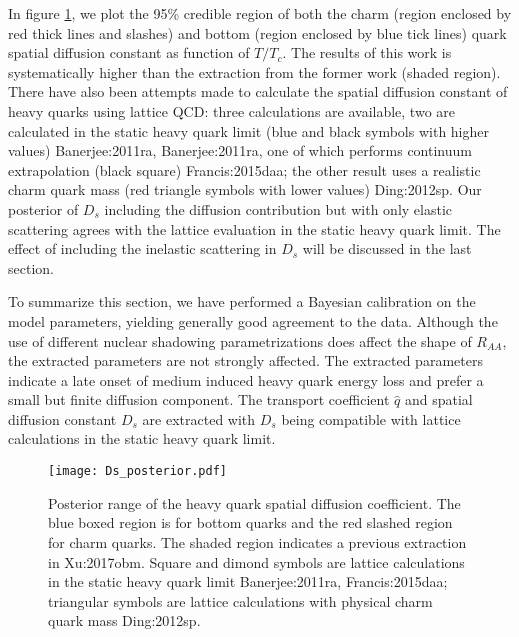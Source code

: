 In figure \ref{plots:posterior_Ds}, we plot the 95\% credible region of both the charm (region enclosed by red thick lines and slashes) and bottom (region enclosed by blue tick lines) quark spatial diffusion constant as function of $T/T_c$.
The results of this work is systematically higher than the extraction from the former work (shaded region).
There have also been attempts made to calculate the spatial diffusion constant of heavy quarks using lattice QCD: three calculations are available, two are calculated in the static heavy quark limit (blue and black symbols with higher values) {Banerjee:2011ra, Banerjee:2011ra}, one of which performs continuum extrapolation (black square) {Francis:2015daa}; the other result uses a realistic charm quark mass (red triangle symbols with lower values) {Ding:2012sp}.
Our posterior of $D_s$ including the diffusion contribution but with only elastic scattering agrees with the lattice evaluation in the static heavy quark limit.
The effect of including the inelastic scattering in $D_s$ will be discussed in the last section.

To summarize this section, we have performed a Bayesian calibration on the model parameters, yielding
generally good agreement to the data.
Although the use of different nuclear shadowing parametrizations does affect the shape of $R_{AA}$, the extracted parameters are not strongly affected.
The extracted parameters indicate a late onset of medium induced heavy quark energy loss and prefer a small but finite diffusion component.
The transport coefficient $\hat{q}$ and spatial diffusion constant $D_s$ are extracted with $D_s$ being compatible with lattice calculations in the static heavy quark limit. 

\begin{figure}
\texttt{[image: Ds\_posterior.pdf]}
\caption{Posterior range of the heavy quark spatial diffusion coefficient. The blue boxed region is for bottom quarks and the red slashed region for charm quarks. The shaded region indicates a previous extraction in {Xu:2017obm}. Square and dimond symbols are lattice calculations in the static heavy quark limit {Banerjee:2011ra, Francis:2015daa}; triangular symbols are lattice calculations with physical charm quark mass {Ding:2012sp}.}\label{plots:posterior_Ds}
\end{figure}

